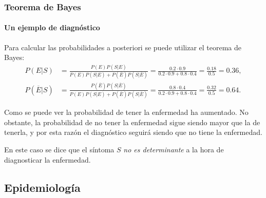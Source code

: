 \begin{frame}
\frametitle{Teorema de Bayes}
\framesubtitle{Un ejemplo de diagnóstico}
Para calcular las probabilidades a posteriori se puede utilizar el teorema de Bayes:
\begin{align*}
P(E|S) &= \frac{P(E)P(S|E)}{P(E)P(S|E)+P(\overline{E})P(S|\overline{E})} = \frac{0.2\cdot 0.9}{0.2\cdot 0.9 + 0.8\cdot 0.4} = \frac{0.18}{0.5}=0.36,\\
P(\overline{E}|S) &= \frac{P(\overline{E})P(S|\overline{E})}{P(E)P(S|E)+P(\overline{E})P(S|\overline{E})} = \frac{0.8\cdot 0.4}{0.2\cdot 0.9 + 0.8\cdot 0.4} = \frac{0.32}{0.5}=0.64.
\end{align*}

Como se puede ver la probabilidad de tener la enfermedad ha aumentado.
No obstante, la probabilidad de no tener la enfermedad sigue siendo mayor que la de tenerla, y por esta razón el diagnóstico seguirá siendo que no tiene la enfermedad.

En este caso se dice que el síntoma $S$ \emph{no es determinante} a la hora de diagnosticar la enfermedad.

\end{frame}


\subsection{Epidemiología}

